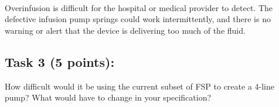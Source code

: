 \documentclass{article}
\newcommand{\head}{\subsection*}
\begin{document}
\begin{enumerate}
\begin{enumerate}
\\
Overinfusion is difficult for the hospital or medical provider to detect. The defective infusion pump springs could work intermittently, and there is no warning or alert that the device is delivering too much of the fluid. 
      \end{enumerate}

\end{enumerate}


\head{Task 3 (5 points):}


How difficult would it be using the current subset of FSP to create
a 4-line pump? What would have to change in your specification?
\end{document}

